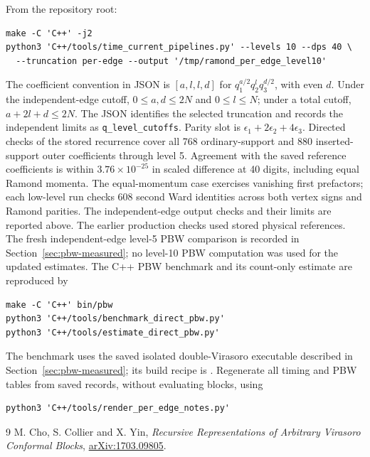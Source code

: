 \documentclass[11pt]{article}
\numberwithin{equation}{section}
\begin{document}
\begin{samepage}
From the repository root:
\begin{verbatim}
make -C 'C++' -j2
python3 'C++/tools/time_current_pipelines.py' --levels 10 --dps 40 \
  --truncation per-edge --output '/tmp/ramond_per_edge_level10'
\end{verbatim}
\end{samepage}
The coefficient convention in JSON is $[a,l,l,d]$ for
$q_1^{a/2}q_2^lq_3^{d/2}$, with even $d$. Under the independent-edge
cutoff, $0\le a,d\le2N$ and $0\le l\le N$; under a total cutoff,
$a+2l+d\le2N$. The JSON identifies the selected truncation and records
the independent limits as \texttt{q\_level\_cutoffs}.
Parity slot is $\epsilon_1+2\epsilon_2+4\epsilon_3$.
Directed checks of the stored recurrence cover all 768 ordinary-support and
880 inserted-support outer coefficients through level 5. Agreement with the
saved reference coefficients is within $3.76\times10^{-25}$ in scaled
difference at 40 digits, including equal Ramond momenta. The equal-momentum
case exercises vanishing first prefactors; each low-level run checks 608
second Ward identities across both vertex signs and Ramond parities.
The independent-edge output checks and their limits are reported above.
The earlier production checks used stored physical references. The fresh
independent-edge level-5 PBW comparison is recorded in
Section~\ref{sec:pbw-measured}; no level-10 PBW computation was used for the
updated estimates. The C++ PBW benchmark and its count-only estimate are
reproduced by
\begin{verbatim}
make -C 'C++' bin/pbw
python3 'C++/tools/benchmark_direct_pbw.py'
python3 'C++/tools/estimate_direct_pbw.py'
\end{verbatim}
The benchmark uses the saved isolated double-Virasoro executable described
in Section~\ref{sec:pbw-measured}; its build recipe is
.
Regenerate all timing and PBW tables from saved records,
without evaluating blocks, using
\begin{verbatim}
python3 'C++/tools/render_per_edge_notes.py'
\end{verbatim}

\begin{thebibliography}{9}
 M. Cho, S. Collier and X. Yin,
\emph{Recursive Representations of Arbitrary Virasoro Conformal Blocks},
\href{https://arxiv.org/abs/1703.09805}{arXiv:1703.09805}.
\end{thebibliography}
\end{document}
